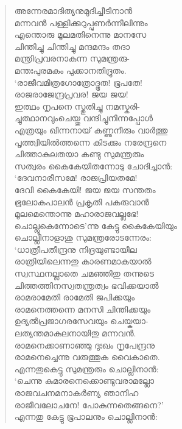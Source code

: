 \begin{verse}
അന്നേരമാദിത്യനുമുദിച്ചീടിനാന്‍\\
മന്നവന്‍ പള്ളിക്കുറുപ്പുണര്‍ന്നീലിന്നും\\
എന്തൊരു മൂലമതിനെന്നു മാനസേ\\
ചിന്തിച്ചു ചിന്തിച്ചു മന്ദമന്ദം തദാ\\
മന്ത്രിപ്രവരനാകുന്ന സുമന്ത്രരു-\\
മന്തഃപുരമകം പുക്കാനതിദ്രുതം.\\
‘രാജീവമിത്രഗോത്രോദ്ഭൂത! ഭൂപതേ!\\
രാജരാജേന്ദ്രപ്രവര! ജയ ജയ!\\
ഇത്ഥം നൃപനെ സ്തുതിച്ചു നമസ്കരി-\\
ച്ചുത്ഥാനവുംചെയ്തു വന്ദിച്ചുനിന്നപ്പോള്‍\\
എത്രയും ഖിന്നനായ് കണ്ണുനീരും വാര്‍ത്തു\\
പൃത്ത്വിയില്‍ത്തന്നെ കിടക്കും നരേന്ദ്രനെ\\
ചിത്താകുലതയാ കണ്ടു സുമന്ത്രരും\\
സത്വരം കൈകേയിതന്നോടു ചോദിച്ചാന്‍:\\
‘ദേവനാരീസമേ! രാജപ്രിയതമേ!\\
ദേവി കൈകേയി! ജയ ജയ സന്തതം\\
ഭൂലോകപാലന്‍ പ്രകൃതി പകരുവാന്‍\\
മൂലമെന്തൊന്നു മഹാരാജവല്ലഭേ!\\
ചൊല്ലൂകെന്നോടെ’ന്നു കേട്ടു കൈകേയിയും\\
ചൊല്ലിനാളാശു സുമന്ത്രരോടന്നേരം:\\
‘ധാത്രീപതീന്ദ്രനു നിദ്രയുണ്ടായീല\\
രാത്രിയിലെന്നതു കാരണമാകയാല്‍\\
സ്വസ്ഥനല്ലാതെ ചമഞ്ഞിതു തന്നുടെ\\
ചിത്തത്തിനസ്വതന്ത്രത്വം ഭവിക്കയാല്‍\\
രാമരാമേതി രാമേതി ജപിക്കയും\\
രാമനെത്തന്നെ മനസി ചിന്തിക്കയും\\
ഉദ്യല്‍പ്രജാഗരസേവയും ചെയ്കയാ-\\
ലത്യന്തമാകുലനായിതു മന്നവന്‍.\\
രാമനെക്കാണാഞ്ഞു ദുഃഖം നൃപേന്ദ്രനു\\
രാമനെച്ചെന്നു വരുത്തുക വൈകാതെ.\\
എന്നതുകെട്ടു സുമന്ത്രരും ചൊല്ലിനാന്‍:\\
‘ചെന്നു കുമാരനെക്കൊണ്ടുവരാമല്ലോ\\
രാജവചനമനാകര്‍ണ്യ ഞാനിഹ\\
രാജീവലോചനേ! പോകുന്നതെങ്ങനെ?’\\
എന്നതു കേട്ടു ഭൂപാലനും ചൊല്ലിനാന്‍:\\

\end{verse}
